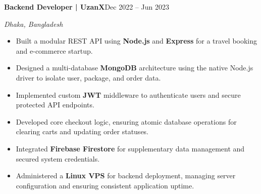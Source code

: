 {\noindent\textbf{Backend Developer | UzanX}\hfill Dec 2022 -- Jun 2023\par}
{\noindent\textit{Dhaka, Bangladesh}\par}
\vspace{0.4em}
\begin{itemize}
  \item Built a modular REST API using \textbf{Node.js} and \textbf{Express} for a travel booking and e-commerce startup.
  \item Designed a multi-database \textbf{MongoDB} architecture using the native Node.js driver to isolate user, package, and order data.
  \item Implemented custom \textbf{JWT} middleware to authenticate users and secure protected API endpoints.
  \item Developed core checkout logic, ensuring atomic database operations for clearing carts and updating order statuses.
  \item Integrated \textbf{Firebase Firestore} for supplementary data management and secured system credentials.
  \item Administered a \textbf{Linux VPS} for backend deployment, managing server configuration and ensuring consistent application uptime.
\end{itemize}
